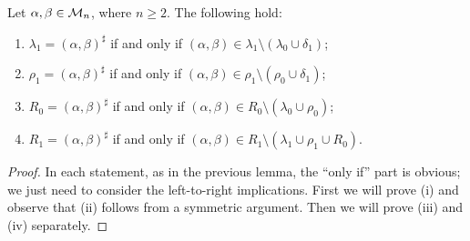 \begin{lemma}
  \label{lem:high-genpairs}
  Let $\alpha,\beta \in \mathcal{M}_n$, where $n \geq 2$.  The following hold:
  \begin{enumerate}[\rm(i)]
  \item $\lambda_1 = (\alpha, \beta)^\sharp$ if and only if
    $(\alpha,\beta) \in \lambda_1 \setminus (\lambda_0 \cup \delta_1)$;
  \item $\rho_1 = (\alpha, \beta)^\sharp$ if and only if
    $(\alpha,\beta) \in \rho_1 \setminus (\rho_0 \cup \delta_1)$;
  \item $R_0 = (\alpha, \beta)^\sharp$ if and only if
    $(\alpha,\beta) \in R_0 \setminus (\lambda_0 \cup \rho_0)$;
  \item $R_1 = (\alpha, \beta)^\sharp$ if and only if
    $(\alpha,\beta) \in R_1 \setminus (\lambda_1 \cup \rho_1 \cup R_0)$.
  \end{enumerate}
  \begin{proof}
    In each statement, as in the previous lemma, the ``only if'' part is
    obvious; we just need to consider the left-to-right implications.  First we
    will prove (i) and observe that (ii) follows from a symmetric argument.
    Then we will prove (iii) and (iv) separately.


\end{proof}
\end{lemma}

